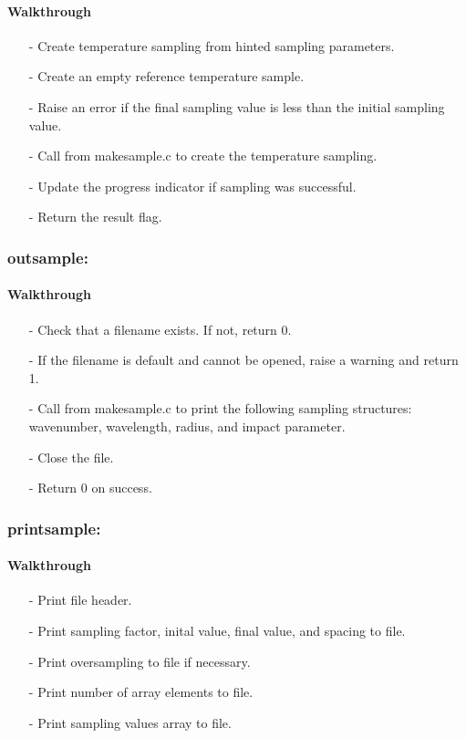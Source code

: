\documentclass[letterpaper,12pt]{article}
\begin{document}
\paragraph{Walkthrough}
\begin{itemize}[leftmargin=10pt, noitemsep, parsep=0pt, topsep=0ex]
\item[-] Create temperature sampling from hinted sampling parameters.
\item[-] Create an empty reference temperature sample.
\item[-] Raise an error if the final sampling value is less than the initial sampling value.
\item[-] Call  from makesample.c to create the temperature sampling.
\item[-] Update the progress indicator if sampling was successful.
\item[-] Return the result flag.
\end{itemize}

\subsubsection{outsample:}
\paragraph{Walkthrough}
\begin{itemize}[leftmargin=10pt, noitemsep, parsep=0pt, topsep=0ex]
\item[-] Check that a filename exists. If not, return 0.
\item[-] If the filename is default and cannot be opened, raise a warning and return 1.
\item[-] Call  from makesample.c to print the following sampling structures:  wavenumber, wavelength, radius, and impact parameter.
\item[-] Close the file.
\item[-] Return 0 on success.
\end{itemize}

\subsubsection{printsample:}
\paragraph{Walkthrough}
\begin{itemize}[leftmargin=10pt, noitemsep, parsep=0pt, topsep=0ex]
\item[-] Print file header.
\item[-] Print sampling factor, inital value, final value, and spacing to file.
\item[-] Print oversampling to file if necessary.
\item[-] Print number of array elements to file.
\item[-] Print sampling values array to file.
\end{itemize}
\end{document}
